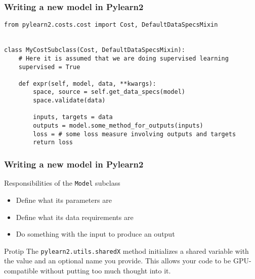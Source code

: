 \documentclass[mathserif, xcolor=dvipsnames]{beamer}
\begin{document}
\begin{frame}[fragile]
    \frametitle{Writing a new model in Pylearn2}
    \begin{examples}
\begin{lstlisting}[caption=Cost subclass implementation mockup]
from pylearn2.costs.cost import Cost, DefaultDataSpecsMixin


class MyCostSubclass(Cost, DefaultDataSpecsMixin):
    # Here it is assumed that we are doing supervised learning
    supervised = True

    def expr(self, model, data, **kwargs):
        space, source = self.get_data_specs(model)
        space.validate(data)

        inputs, targets = data
        outputs = model.some_method_for_outputs(inputs)
        loss = # some loss measure involving outputs and targets
        return loss
\end{lstlisting}
    \end{examples}
\end{frame}

\begin{frame}[fragile]
    \frametitle{Writing a new model in Pylearn2}
    \begin{block}{Responsibilities of the \texttt{Model} subclass}
    \begin{itemize}
        \item{Define what its parameters are}
        \item{Define what its data requirements are}
        \item{Do something with the input to produce an output}
    \end{itemize}
    \end{block}

    \begin{alertblock}{Protip}
    The \texttt{pylearn2.utils.sharedX} method initializes a shared variable
    with the value and an optional name you provide. This allows your code to
    be GPU-compatible without putting too much thought into it.
    \end{alertblock}
\end{frame}
\end{document}
